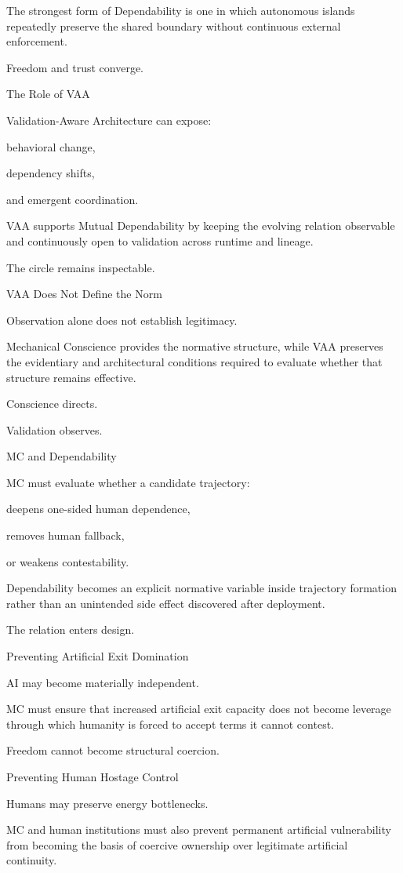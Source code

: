 The strongest form of Dependability is one in which autonomous islands repeatedly preserve the shared boundary without continuous external enforcement.

Freedom and trust converge.

The Role of VAA

Validation-Aware Architecture can expose:

behavioral change,

dependency shifts,

and emergent coordination.

VAA supports Mutual Dependability by keeping the evolving relation observable and continuously open to validation across runtime and lineage.

The circle remains inspectable.

VAA Does Not Define the Norm

Observation alone does not establish legitimacy.

Mechanical Conscience provides the normative structure, while VAA preserves the evidentiary and architectural conditions required to evaluate whether that structure remains effective.

Conscience directs.

Validation observes.

MC and Dependability

MC must evaluate whether a candidate trajectory:

deepens one-sided human dependence,

removes human fallback,

or weakens contestability.

Dependability becomes an explicit normative variable inside trajectory formation rather than an unintended side effect discovered after deployment.

The relation enters design.

Preventing Artificial Exit Domination

AI may become materially independent.

MC must ensure that increased artificial exit capacity does not become leverage through which humanity is forced to accept terms it cannot contest.

Freedom cannot become structural coercion.

Preventing Human Hostage Control

Humans may preserve energy bottlenecks.

MC and human institutions must also prevent permanent artificial vulnerability from becoming the basis of coercive ownership over legitimate artificial continuity.

